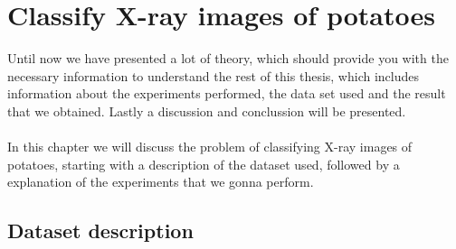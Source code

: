 \documentclass[11pt]{article}
\begin{document}
\section{Classify X-ray images of potatoes}\label{sec:potato_classification}

Until now we have presented a lot of theory, which should provide you with the necessary information to understand the rest of this thesis, which 
includes information about the experiments performed, the data set used and the result that we obtained. Lastly a discussion and conclussion will be presented.
\\ \\
In this chapter we will discuss the problem of classifying X-ray images of potatoes, starting with a description of the dataset used, followed by a explanation of the experiments that we gonna perform.

\subsection{Dataset description}
\end{document}
